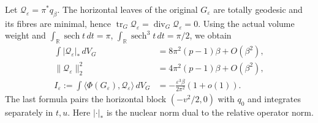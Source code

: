 \documentclass[a4paper,11pt]{article}
\numberwithin{equation}{section}
\theoremstyle{definition}
\newcommand{\tr}{\operatorname{tr}}
\newcommand{\R}{\mathbb R}
\begin{document}
Let $\mathcal Q_\varepsilon=\pi^*q_\beta$.
The horizontal leaves of the original $G_\varepsilon$ are totally geodesic and its fibres are minimal, hence
$\tr_G\mathcal Q_\varepsilon=\operatorname{div}_G\mathcal Q_\varepsilon=0$.
Using the actual volume weight and $\int_\R\operatorname{sech}t\,dt=\pi$,
$\int_\R\operatorname{sech}^3t\,dt=\pi/2$, we obtain
\begin{equation}\label{eq:ED-global-pairings}
\begin{aligned}
\int|\mathcal Q_\varepsilon|_*\,dV_G
&=8\pi^2(p-1)\beta+O(\beta^2),\\
\|\mathcal Q_\varepsilon\|_2^2
&=4\pi^2(p-1)\beta+O(\beta^2),\\
I_\varepsilon:=\int\langle\Phi(G_\varepsilon),\mathcal Q_\varepsilon\rangle\,dV_G
&=-\frac{\varepsilon^3\beta}{2\pi^2}(1+o(1)).
\end{aligned}
\end{equation}
The last formula pairs the horizontal block $(-v^2/2,0)$ with $q_0$
and integrates separately in $t,u$. Here $|\cdot|_*$ is the nuclear norm dual to the relative operator norm.
\end{document}
